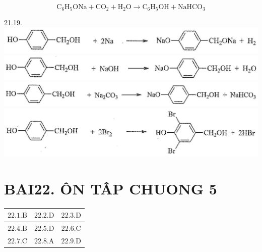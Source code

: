 \documentclass[10pt]{article}
\begin{document}
$$
\mathrm{C}_{6} \mathrm{H}_{5} \mathrm{ONa}+\mathrm{CO}_{2}+\mathrm{H}_{2} \mathrm{O} \rightarrow \mathrm{C}_{6} \mathrm{H}_{5} \mathrm{OH}+\mathrm{NaHCO}_{3}
$$

21.19.\\
\includegraphics[max width=\textwidth, center]{2025_10_23_ed7118e3280f74e91193g-35(2)}\\
\includegraphics[max width=\textwidth, center]{2025_10_23_ed7118e3280f74e91193g-35(1)}\\
\includegraphics[max width=\textwidth, center]{2025_10_23_ed7118e3280f74e91193g-35}\\
\includegraphics[max width=\textwidth, center]{2025_10_23_ed7118e3280f74e91193g-35(4)}

\section*{BAI22. ÔN TÂP CHUONG 5}
\begin{center}
\begin{tabular}{|c|c|c|}
\hline
$22.1 . \mathrm{B}$ & $22.2 . \mathrm{D}$ & $22.3 . \mathrm{D}$ \\
\hline
$22.4 . \mathrm{B}$ & $22.5 . \mathrm{D}$ & $22.6 . \mathrm{C}$ \\
\hline
$22.7 . \mathrm{C}$ & $22.8 . \mathrm{A}$ & $22.9 . \mathrm{D}$ \\
\hline
\end{tabular}
\end{center}
\end{document}
